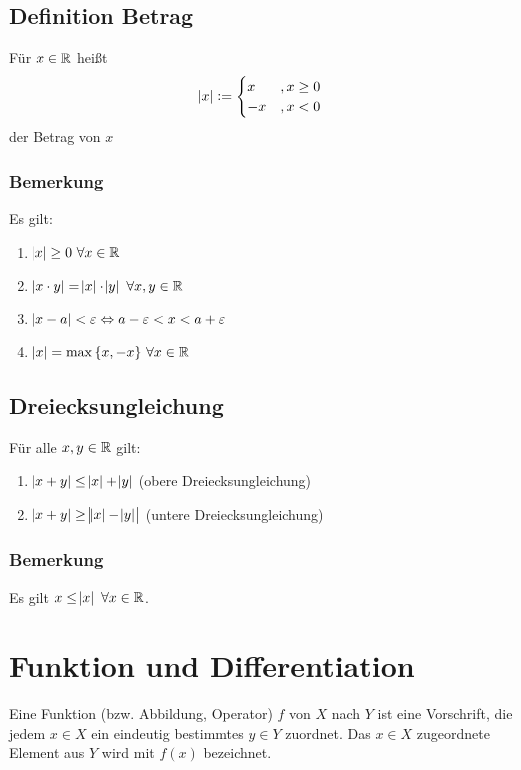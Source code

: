 \subsection{Definition Betrag}
Für $x \in \mathbb{R}$ heißt
\begin{equation*}
    \abs{x} :=
        \begin{cases}
            x &,x\geq0\\
            -x &,x<0
        \end{cases}
\end{equation*}
der Betrag von $x$

\subsubsection{Bemerkung}
Es gilt:
\begin{enumerate}[label= (\alph*)]
    \item $\abs{x} \geq 0\ \forall x \in \mathbb{R}$
    \item $\abs{x \cdot y} = \abs{x} \cdot \abs{y}\ \forall x,y \in \mathbb{R}$
    \item $\abs{x-a} < \varepsilon \Leftrightarrow a-\varepsilon < x < a+\varepsilon$
    \item $\abs{x} = \max{\{x, -x\}}\ \forall x \in \mathbb{R}$
\end{enumerate}

\subsection{Dreiecksungleichung}
Für alle $x, y \in \mathbb{R}$ gilt:
\begin{enumerate}[label= (\alph*)]
    \item $\abs{x+y} \leq \abs{x} + \abs{y}$ (obere Dreiecksungleichung)
    \item $\abs{x+y} \geq \abs{\abs{x}-\abs{y}}$ (untere Dreiecksungleichung)
\end{enumerate}

\subsubsection{Bemerkung}
Es gilt $x \leq \abs{x}\ \forall x \in \mathbb{R}$.

\section{Funktion und Differentiation}
Eine Funktion (bzw. Abbildung, Operator) $f$ von $X$ nach $Y$ ist eine
Vorschrift, die jedem $x \in X$ ein eindeutig bestimmtes $y \in Y$ zuordnet.
Das $x \in X$ zugeordnete Element aus $Y$ wird mit $f(x)$ bezeichnet.

